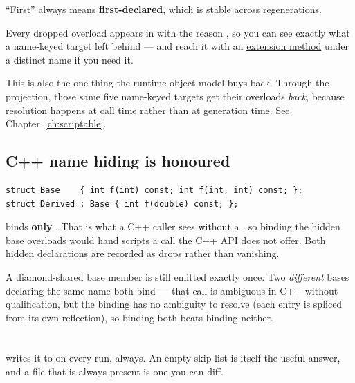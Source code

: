 ``First'' always means \textbf{first-declared}, which is stable across
regenerations.

Every dropped overload appears in  with the reason
, so you can see exactly what a name-keyed
target left behind --- and reach it with an
\hyperref[sec:extensions]{extension method} under a distinct name if you need
it.

\begin{note}
This is also the one thing the runtime object model buys back. Through the
 projection, those same five name-keyed targets get their
overloads \emph{back}, because resolution happens at call time rather than at
generation time. See Chapter~\ref{ch:scriptable}.
\end{note}

\subsection{C++ name hiding is honoured}

\begin{lstlisting}[style=cpp]
struct Base    { int f(int) const; int f(int, int) const; };
struct Derived : Base { int f(double) const; };
\end{lstlisting}

 binds \textbf{only} . That is what a C++ caller
sees without a , so binding the hidden base overloads would
hand scripts a call the C++ API does not offer. Both hidden declarations are
recorded as  drops rather than vanishing.

A diamond-shared base member is still emitted exactly once. Two \emph{different}
bases declaring the same name both bind --- that call is ambiguous in C++
without qualification, but the binding has no ambiguity to resolve (each entry is
spliced from its own reflection), so binding both beats binding neither.

\section{}

 writes it to  on every run,
always. An empty skip list is itself the useful answer, and a file that is
always present is one you can diff.

